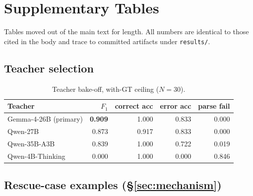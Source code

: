 \documentclass{article}
\begin{document}
\appendix

\section{Supplementary Tables}
\label{app:tables}

Tables moved out of the main text for length. All numbers are identical to
those cited in the body and trace to committed artifacts under
\texttt{results/}.

\subsection{Teacher selection}
\label{app:bakeoff}

\begin{table}[t]
\centering
\small
\begin{tabular}{lrrrr}
\toprule
Teacher & $F_1$ & correct acc & error acc & parse fail \\
\midrule
Gemma-4-26B (primary) & \textbf{0.909} & 1.000 & 0.833 & 0.000 \\
Qwen-27B & 0.873 & 0.917 & 0.833 & 0.000 \\
Qwen-35B-A3B & 0.839 & 1.000 & 0.722 & 0.019 \\
Qwen-4B-Thinking & 0.000 & 1.000 & 0.000 & 0.846 \\
\bottomrule
\end{tabular}
\caption{Teacher bake-off, with-GT ceiling ($N=30$).}
\label{tab:teacher-bakeoff}
\end{table}

\subsection{Rescue-case examples (\S\ref{sec:mechanism})}
\label{app:flip-cases}
\end{document}
